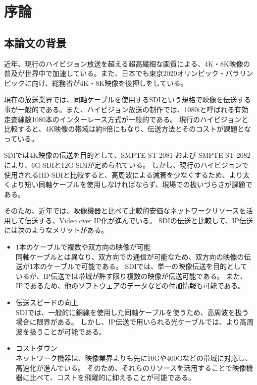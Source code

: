 \chapter{序論}
\label{chap:introduction}

\section{本論文の背景}
近年、現行のハイビジョン放送を超える超高繊細な画質による、4K・8K映像の普及が世界中で加速している。また、日本でも東京2020オリンピック・パラリンピックに向け、総務省が4K・8K映像を後押しをしている。

現在の放送業界では、同軸ケーブルを使用するSDIという規格で映像を伝送する事が一般的である。また、ハイビジョン放送の制作では、1080iと呼ばれる有効走査線数1080本のインターレース方式が一般的である。
現行のハイビジョンと比較すると、4K映像の帯域は約8倍にもなり、伝送方法とそのコストが課題となっている。

SDIでは4K映像の伝送を目的として、SMPTE ST-2081 および SMPTE ST-2082により、6G-SDIと12G-SDIが定められている。
しかし、現行のハイビジョンで使用されるHD-SDIと比較すると、高周波による減衰を少なくするため、より太くより短い同軸ケーブルを使用しなければならず、現場での扱いづらさが課題である。

そのため、近年では、映像機器と比べて比較的安価なネットワークリソースを活用して伝送する、Video over IP化が進んでいる。
SDIの伝送と比較して、IP伝送には次のようなメリットがある。

\begin{itemize}
  \item 1本のケーブルで複数や双方向の映像が可能\mbox{}\\
    同軸ケーブルとは異なり、双方向での通信が可能なため、双方向の映像の伝送が1本のケーブルで可能である。
    SDIでは、単一の映像伝送を目的としているが、IP伝送では帯域が許す限り複数の映像が伝送可能である。
    また、IPであるため、他のソフトウェアのデータなどの付加情報も可能である。
  \item 伝送スピードの向上\mbox{}\\
    SDIでは、一般的に銅線を使用した同軸ケーブルを使うため、高周波を扱う場合に限界がある。
    しかし、IP伝送で用いられる光ケーブルでは、より高周波を扱うことが可能である。
  \item コストダウン\mbox{}\\
    ネットワーク機器は、映像業界よりも先に10Gや400Gなどの帯域に対応し、高速化が進んでいる。
    そのため、それらのリソースを活用することで映像機器に比べて、コストを飛躍的に抑えることが可能である。
\end{itemize}

